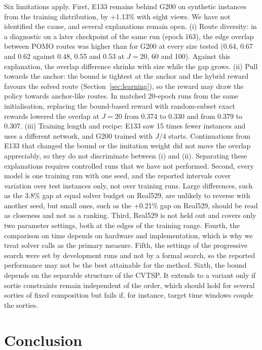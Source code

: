 \documentclass[preprint,12pt,authoryear]{elsarticle}
\begin{document}
Six limitations apply. First, E133 remains behind G200 on synthetic instances from the training distribution, by +1.13\% with eight views. We have not identified the cause, and several explanations remain open. (i) Route diversity: in a diagnostic on a later checkpoint of the same run (epoch 163), the edge overlap between POMO routes was higher than for G200 at every size tested (0.64, 0.67 and 0.62 against 0.48, 0.55 and 0.53 at $J = 20$, 60 and 100). Against this explanation, the overlap difference shrinks with size while the gap grows. (ii) Pull towards the anchor: the bound is tightest at the anchor and the hybrid reward favours the solved route (Section~\ref{sec:learning}), so the reward may draw the policy towards anchor-like routes. In matched 20-epoch runs from the same initialisation, replacing the bound-based reward with random-subset exact rewards lowered the overlap at $J = 20$ from 0.374 to 0.330 and from 0.379 to 0.307. (iii) Training length and recipe: E133 saw 15 times fewer instances and uses a different network, and G200 trained with $J/4$ starts. Continuations from E133 that changed the bound or the imitation weight did not move the overlap appreciably, so they do not discriminate between (i) and (ii). Separating these explanations requires controlled runs that we have not performed. Second, every model is one training run with one seed, and the reported intervals cover variation over test instances only, not over training runs. Large differences, such as the 3.8\% gap at equal solver budget on Real529, are unlikely to reverse with another seed, but small ones, such as the +0.21\% gap on Real529, should be read as closeness and not as a ranking. Third, Real529 is not held out and covers only two parameter settings, both at the edges of the training range. Fourth, the comparison on time depends on hardware and implementation, which is why we treat solver calls as the primary measure. Fifth, the settings of the progressive search were set by development runs and not by a formal search, so the reported performance may not be the best attainable for the method. Sixth, the bound depends on the separable structure of the CVTSP. It extends to a variant only if sortie constraints remain independent of the order, which should hold for several sorties of fixed composition but fails if, for instance, target time windows couple the sorties.

\section{Conclusion}
\label{sec:conclusion}
\end{document}
